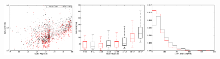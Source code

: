 \documentclass[12pt, preprint]{aastex}
\begin{document}
\begin{figure}[p]
\begin{center}
\includegraphics[width=0.32\textwidth]{f6g}
\includegraphics[width=0.32\textwidth]{f6h}
\includegraphics[width=0.32\textwidth]{f6i}


\end{center}
\end{figure}
\end{document}
